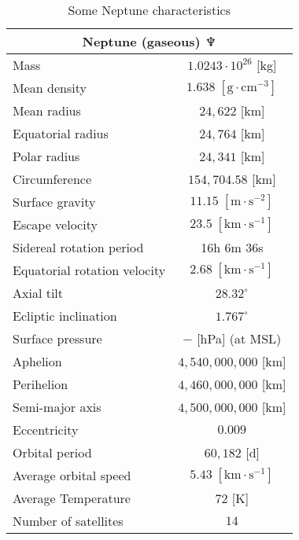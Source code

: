 	\begin{table}[H]
		\centering
		\begin{tabular}{|l|c|}
		\hline
		\multicolumn{2}{|c|}{\cellcolor[HTML]{9B9B9B}\textbf{Neptune (gaseous) $\neptune$}} \\ \hline
		Mass & $1.0243\cdot 10^{26}$ {[}kg{]} \\ \hline
		Mean density & $1.638\;[\text{g}\cdot \text{cm}^{-3}]$ \\ \hline
		Mean radius & $24,622$ {[}km{]} \\ \hline
		Equatorial radius & $24,764$ {[}km{]} \\ \hline
		Polar radius & $24,341$ {[}km{]} \\ \hline
		Circumference & $154,704.58$ {[}km{]} \\ \hline
		Surface gravity & $11.15\; [\text{m}\cdot \text{s}^{-2}]$ \\ \hline
		Escape velocity & $23.5\;[\text{km}\cdot\text{s}^{-1}]$ \\ \hline
		Sidereal rotation period & 16h 6m 36s \\ \hline
		Equatorial rotation velocity & $2.68\;[\text{km}\cdot\text{s}^{-1}]$ \\ \hline
		Axial tilt & $28.32^\circ$ \\ \hline
		Ecliptic inclination & $1.767^\circ$ \\ \hline
		Surface pressure & $-$ {[}hPa{]} (at MSL) \\ \hline
		Aphelion & $4,540,000,000$ {[}km{]} \\ \hline
		Perihelion & $4,460,000,000$ {[}km{]} \\ \hline
		Semi-major axis & $4,500,000,000$ {[}km{]} \\ \hline
		Eccentricity & $0.009$ \\ \hline
		Orbital period & $60,182$ {[}d{]} \\ \hline
		Average orbital speed & $5.43\;[\text{km}\cdot\text{s}^{-1}]$ \\ \hline
		Average Temperature & $72$ {[}K{]} \\ \hline
		Number of satellites & $14$ \\ \hline
		\end{tabular}
		\caption{Some Neptune characteristics}
	\end{table}
	
